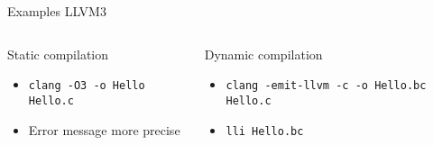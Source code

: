 %
\begin{Frame}{Examples LLVM3}
  \begin{columns}[t]
    \begin{column}{\BW} %
      \begin{block}{Static compilation}
        \begin{itemize}
        \item \texttt{clang -O3 -o Hello Hello.c}
        \item Error message more precise
        \end{itemize}
      \end{block} 
    \end{column}
    
    \begin{column}{\BW} %
      \begin{block}{Dynamic compilation}
        \begin{itemize}
        \item \texttt{clang -emit-llvm -c -o Hello.bc Hello.c}
        \item \texttt{lli Hello.bc}
        \end{itemize}
      \end{block}   
    \end{column}
  \end{columns}  
\end{Frame}


